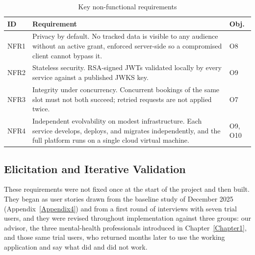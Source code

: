 \begin{table}[htbp]
  \centering
  \caption{Key non-functional requirements}
  \label{tab:nfreq}
  \begin{tabular}{|l|p{8.2cm}|l|}
    \hline
    \textbf{ID} & \textbf{Requirement} & \textbf{Obj.} \\
    \hline
    NFR1 & Privacy by default. No tracked data is visible to any
           audience without an active grant, enforced server-side so a
           compromised client cannot bypass it. & O8 \\
    \hline
    NFR2 & Stateless security. RSA-signed JWTs validated locally by
           every service against a published JWKS key. & O9 \\
    \hline
    NFR3 & Integrity under concurrency. Concurrent bookings of the
           same slot must not both succeed; retried requests are not applied
           twice. & O7 \\
    \hline
    NFR4 & Independent evolvability on modest infrastructure. Each
           service develops, deploys, and migrates independently, and the
           full platform runs on a single cloud virtual machine. & O9, O10 \\
    \hline
  \end{tabular}
\end{table}

\subsection{Elicitation and Iterative Validation}
\label{sec:elicitation}

These requirements were not fixed once at the start of the project and then
built. They began as user stories drawn from the baseline study of December
2025 (Appendix~\ref{Appendix4}) and from a first round of interviews with seven
trial users, and they were revised throughout implementation against three
groups: our advisor, the three mental-health professionals introduced in
Chapter~\ref{Chapter1}, and those same trial users, who returned months later
to use the working application and say what did and did not work.

